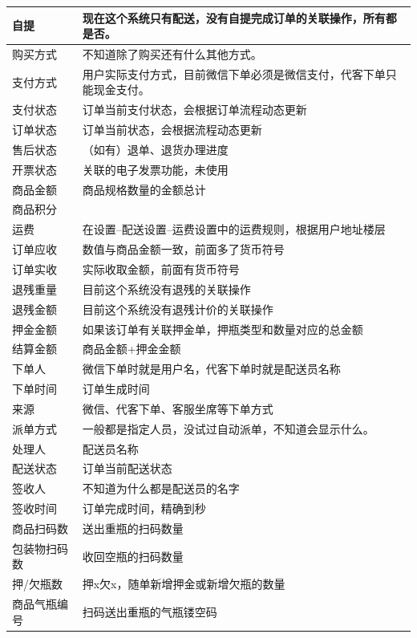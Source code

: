 \documentclass[UTF8]{ctexart}
\begin{document}
\begin{longtable}[h!]{ | m{3cm} | m{12cm} | }
		\hline
		自提& 现在这个系统只有配送，没有自提完成订单的关联操作，所有都是否。\\
		\hline
		购买方式& 不知道除了购买还有什么其他方式。 \\
		\hline
		支付方式& 用户实际支付方式，目前微信下单必须是微信支付，代客下单只能现金支付。\\
		\hline
		支付状态& 订单当前支付状态，会根据订单流程动态更新\\
		\hline
		订单状态& 订单当前状态，会根据流程动态更新\\
		\hline
		售后状态& （如有）退单、退货办理进度\\
		\hline
		开票状态& 关联的电子发票功能，未使用\\
		\hline
		商品金额& 商品规格数量的金额总计 \\
		\hline
		商品积分& \\
		\hline
		运费& 在设置--配送设置--运费设置中的运费规则，根据用户地址楼层\\
		\hline
		订单应收& 数值与商品金额一致，前面多了货币符号\\
		\hline
		订单实收& 实际收取金额，前面有货币符号\\
		\hline
		退残重量& 目前这个系统没有退残的关联操作\\
		\hline
		退残金额& 目前这个系统没有退残计价的关联操作\\
		\hline
		押金金额& 如果该订单有关联押金单，押瓶类型和数量对应的总金额\\
		\hline
		结算金额& 商品金额+押金金额\\
		\hline
		下单人& 微信下单时就是用户名，代客下单时就是配送员名称\\
		\hline
		下单时间& 订单生成时间\\
		\hline
		来源& 微信、代客下单、客服坐席等下单方式\\
		\hline
		派单方式& 一般都是指定人员，没试过自动派单，不知道会显示什么。\\
		\hline
		处理人& 配送员名称\\
		\hline
		配送状态& 订单当前配送状态\\
		\hline
		签收人& 不知道为什么都是配送员的名字\\
		\hline
		签收时间& 订单完成时间，精确到秒\\
		\hline
		商品扫码数& 送出重瓶的扫码数量\\
		\hline
		包装物扫码数& 收回空瓶的扫码数量\\
		\hline
		押/欠瓶数& 押x欠x，随单新增押金或新增欠瓶的数量\\
		\hline
		商品气瓶编号& 扫码送出重瓶的气瓶镂空码\\

\end{longtable}
\end{document}
